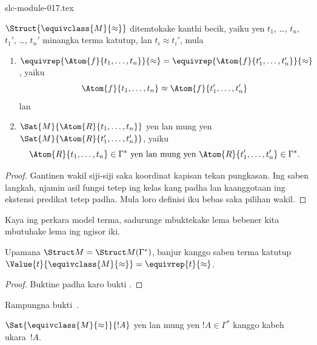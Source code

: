 \begin{filecontents*}[overwrite]{slc-module-017.tex}
\begin{prop}
$\Struct{\equivclass{M}{\approx}}$ ditemtokake kanthi becik, yaiku yen
$t_1$, \dots, $t_n$, $t_1'$, \dots, $t_n'$ minangka terma katutup, lan
$t_i \approx t_i'$, mula
\begin{enumerate}
\item $\equivrep{\Atom{f}{t_1,\dots, t_n}}{\approx} =
    \equivrep{\Atom{f}{t_1',\dots, t_n'}}{\approx}$, yaiku
  \[
  \Atom{f}{t_1,\dots, t_n} \approx \Atom{f}{t_1',\dots, t_n'}
  \]
  lan
\item $\Sat{M}{\Atom{R}{t_1,\dots, t_n}}$ yen lan mung yen
  $\Sat{M}{\Atom{R}{t_1',\dots, t_n'}}$, yaiku
  \[
    \Atom{R}{t_1,\dots, t_n} \in \Gamma^* \text{ yen lan mung yen }
    \Atom{R}{t_1',\dots, t_n'} \in \Gamma^*.
  \]
\end{enumerate}
\end{prop}

\begin{proof}
Gantinen wakil siji-siji saka koordinat kapisan tekan pungkasan.
Ing saben langkah,  njamin asil fungsi
tetep ing kelas kang padha lan kaanggotaan ing ekstensi predikat
tetep padha. Mula loro definisi iku bebas saka pilihan wakil.
\end{proof}

Kaya ing perkara model terma, sadurunge mbuktekake lema bebener kita
mbutuhake lema ing ngisor iki.

\begin{lem}
 Upamana $\Struct M = \Struct M
 (\Gamma^*)$, banjur kanggo saben terma katutup
$\Value{t}{\equivclass{M}{\approx}} = \equivrep{t}
 {\approx}$.
\end{lem}
\begin{proof}
Buktine padha karo bukti .
\end{proof}

\begin{prob}
Rampungna bukti~.
\end{prob}

\begin{lem}
$\Sat{\equivclass{M}{\approx}}{!A}$ yen lan mung yen $!A \in
\Gamma^*$ kanggo kabeh ukara~$!A$.
\end{lem}


\end{filecontents*}
